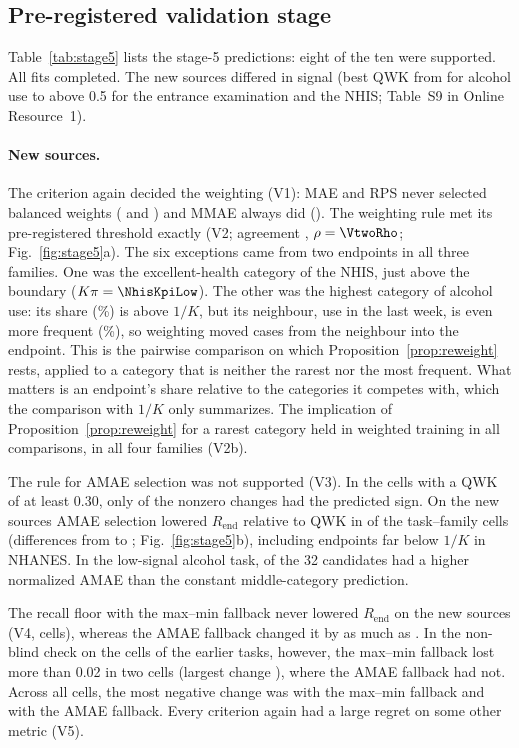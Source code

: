 \documentclass[pdflatex,sn-mathphys-ay]{sn-jnl}
\theoremstyle{thmstyleone}
\theoremstyle{thmstylethree}
\begin{document}
\subsection{Pre-registered validation stage}\label{sec:res-stage5}

Table~\ref{tab:stage5} lists the stage-5 predictions: eight of the ten were supported. All \FitsStageFive{} fits completed. The new sources differed in signal (best QWK from \FiveDrugBestQwk{} for alcohol use to above 0.5 for the entrance examination and the NHIS; Table~S9 in Online Resource~1).

\paragraph{New sources.} The criterion again decided the weighting (V1): MAE and RPS never selected balanced weights (\VoneBalMae{} and \VoneBalRps{}) and MMAE always did (\VoneBalMmae{}). The weighting rule met its pre-registered threshold exactly (V2; agreement \VtwoAgr{}, $\rho=\VtwoRho$; Fig.~\ref{fig:stage5}a). The six exceptions came from two endpoints in all three families. One was the excellent-health category of the NHIS, just above the boundary ($K\pi=\NhisKpiLow$). The other was the highest category of alcohol use: its share (\VtwoAlcHighShare\%) is above $1/K$, but its neighbour, use in the last week, is even more frequent (\VtwoAlcNbrShare\%), so weighting moved cases from the neighbour into the endpoint. This is the pairwise comparison on which Proposition~\ref{prop:reweight} rests, applied to a category that is neither the rarest nor the most frequent. What matters is an endpoint's share relative to the categories it competes with, which the comparison with $1/K$ only summarizes. The implication of Proposition~\ref{prop:reweight} for a rarest category held in weighted training in all \VtwobN{} comparisons, in all four families (V2b).

The rule for AMAE selection was not supported (V3). In the cells with a QWK of at least 0.30, only \VthreeOk{} of the \VthreeN{} nonzero changes had the predicted sign. On the new sources AMAE selection lowered $R_{\mathrm{end}}$ relative to QWK in \FiveAmaeNeg{} of the \FiveAmaeCells{} task--family cells (differences from \FiveAmaeMin{} to \FiveAmaeMax{}; Fig.~\ref{fig:stage5}b), including endpoints far below $1/K$ in NHANES. In the low-signal alcohol task, \FiveConstDrug{} of the 32 candidates had a higher normalized AMAE than the constant middle-category prediction.

The recall floor with the max--min fallback never lowered $R_{\mathrm{end}}$ on the new sources (V4, \VfourCells{} cells), whereas the AMAE fallback changed it by as much as \VfourOrigMin{}. In the non-blind check on the \VfourOldCells{} cells of the earlier tasks, however, the max--min fallback lost more than 0.02 in two cells (largest change \VfourOldMin{}), where the AMAE fallback had not. Across all \VfourAllCells{} cells, the most negative change was \VfourAllMinStar{} with the max--min fallback and \VfourAllMinOrig{} with the AMAE fallback. Every criterion again had a large regret on some other metric (V5).
\end{document}
